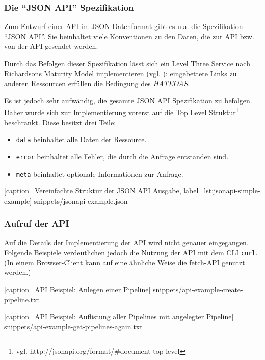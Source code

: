 \subsubsection{Die ``JSON API'' Spezifikation}
\label{subsec:jsonapi}

Zum Entwurf einer API im JSON Datenformat gibt es u.a. die Spezifikation ``JSON API''. Sie beinhaltet viele Konventionen zu den Daten, die zur API bzw. von der API gesendet werden.

Durch das Befolgen dieser Spezifikation lässt sich ein Level Three Service nach Richardsons Maturity Model implementieren (vgl. \citep[20]{Webber2010}): eingebettete Links zu anderen Ressourcen erfüllen die Bedingung des \emph{\ac{HATEOAS}}.

Es ist jedoch sehr aufwändig, die gesamte JSON API Spezifikation zu befolgen. Daher wurde sich zur Implementierung vorerst auf die Top Level Struktur\footnote{vgl. http://jsonapi.org/format/\#document-top-level} beschränkt. Diese besitzt drei Teile:

\begin{itemize}
  \item \texttt{data} beinhaltet alle Daten der Ressource.
  \item \texttt{error} beinhaltet alle Fehler, die durch die Anfrage entstanden sind.
  \item \texttt{meta} beinhaltet optionale Informationen zur Anfrage.
\end{itemize}


  [caption={Vereinfachte Struktur der JSON API Ausgabe},
  label={lst:jsonapi-simple-example}]
  {snippets/jsonapi-example.json}

\subsubsection{Aufruf der API}
\label{subsec:api-usage}

Auf die Details der Implementierung der API wird nicht genauer eingegangen. Folgende Beispiele verdeutlichen jedoch die Nutzung der API mit dem \ac{CLI} \texttt{curl}. (In einem Browser-Client kann auf eine ähnliche Weise die fetch-API genutzt werden.)


  [caption={API Beispiel: Anlegen einer Pipeline}]
  {snippets/api-example-create-pipeline.txt}


  [caption={API Beispiel: Auflistung aller Pipelines mit angelegter Pipeline}]
  {snippets/api-example-get-pipelines-again.txt}

